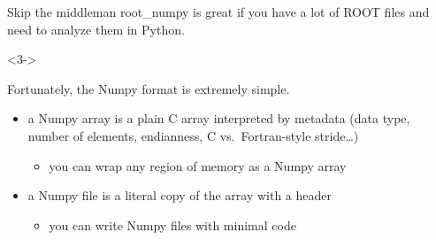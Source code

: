 \documentclass{beamer}
\begin{document}
\begin{frame}{Skip the middleman}
\vspace{0.25 cm}
root\_numpy is great if you have a lot of ROOT files and need to analyze them in Python.

\vspace{0.25 cm}

\begin{uncoverenv}<3->
\vspace{0.25 cm}
\begin{block}{Fortunately, the Numpy format is extremely simple.}
\begin{itemize}\setlength{\itemsep}{0.5 cm}
\item<4-> a Numpy array is a plain C array interpreted by metadata {\small (data type,} {\footnotesize number of elements,} {\scriptsize endianness,} {\tiny C vs.\ Fortran-style stride\ldots)}
\begin{itemize}
\item you can wrap any region of memory as a Numpy array
\end{itemize}

\item<5-> a Numpy file is a literal copy of the array with a header
\begin{itemize}
\item you can write Numpy files with minimal code
\end{itemize}

\end{itemize}
\end{block}
\end{uncoverenv}
\end{frame}
\end{document}
